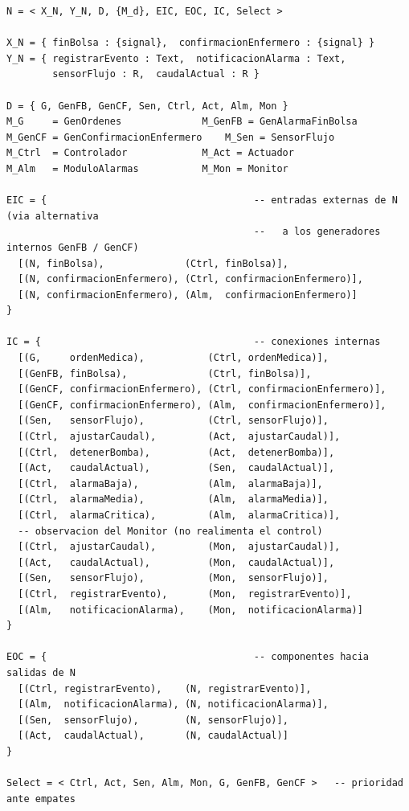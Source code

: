 \documentclass[11pt,a4paper]{article}
\begin{document}
\begin{lstlisting}[style=cml]
N = < X_N, Y_N, D, {M_d}, EIC, EOC, IC, Select >

X_N = { finBolsa : {signal},  confirmacionEnfermero : {signal} }
Y_N = { registrarEvento : Text,  notificacionAlarma : Text,
        sensorFlujo : R,  caudalActual : R }

D = { G, GenFB, GenCF, Sen, Ctrl, Act, Alm, Mon }
M_G     = GenOrdenes              M_GenFB = GenAlarmaFinBolsa
M_GenCF = GenConfirmacionEnfermero    M_Sen = SensorFlujo
M_Ctrl  = Controlador             M_Act = Actuador
M_Alm   = ModuloAlarmas           M_Mon = Monitor

EIC = {                                    -- entradas externas de N (via alternativa
                                           --   a los generadores internos GenFB / GenCF)
  [(N, finBolsa),              (Ctrl, finBolsa)],
  [(N, confirmacionEnfermero), (Ctrl, confirmacionEnfermero)],
  [(N, confirmacionEnfermero), (Alm,  confirmacionEnfermero)]
}

IC = {                                     -- conexiones internas
  [(G,     ordenMedica),           (Ctrl, ordenMedica)],
  [(GenFB, finBolsa),              (Ctrl, finBolsa)],
  [(GenCF, confirmacionEnfermero), (Ctrl, confirmacionEnfermero)],
  [(GenCF, confirmacionEnfermero), (Alm,  confirmacionEnfermero)],
  [(Sen,   sensorFlujo),           (Ctrl, sensorFlujo)],
  [(Ctrl,  ajustarCaudal),         (Act,  ajustarCaudal)],
  [(Ctrl,  detenerBomba),          (Act,  detenerBomba)],
  [(Act,   caudalActual),          (Sen,  caudalActual)],
  [(Ctrl,  alarmaBaja),            (Alm,  alarmaBaja)],
  [(Ctrl,  alarmaMedia),           (Alm,  alarmaMedia)],
  [(Ctrl,  alarmaCritica),         (Alm,  alarmaCritica)],
  -- observacion del Monitor (no realimenta el control)
  [(Ctrl,  ajustarCaudal),         (Mon,  ajustarCaudal)],
  [(Act,   caudalActual),          (Mon,  caudalActual)],
  [(Sen,   sensorFlujo),           (Mon,  sensorFlujo)],
  [(Ctrl,  registrarEvento),       (Mon,  registrarEvento)],
  [(Alm,   notificacionAlarma),    (Mon,  notificacionAlarma)]
}

EOC = {                                    -- componentes hacia salidas de N
  [(Ctrl, registrarEvento),    (N, registrarEvento)],
  [(Alm,  notificacionAlarma), (N, notificacionAlarma)],
  [(Sen,  sensorFlujo),        (N, sensorFlujo)],
  [(Act,  caudalActual),       (N, caudalActual)]
}

Select = < Ctrl, Act, Sen, Alm, Mon, G, GenFB, GenCF >   -- prioridad ante empates
\end{lstlisting}
\end{document}
